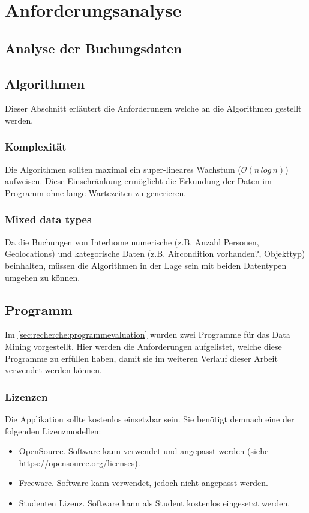 

\chapter{Anforderungsanalyse}
\label{sec:anforderungsanalyse}

\section{Analyse der Buchungsdaten}

\section{Algorithmen}
Dieser Abschnitt erläutert die Anforderungen welche an die Algorithmen gestellt werden.

\subsection{Komplexität}
Die Algorithmen sollten maximal ein super-lineares Wachstum ($\mathcal{O}(n\,log\,n)$) aufweisen. Diese Einschränkung ermöglicht die Erkundung der Daten im Programm ohne lange Wartezeiten zu generieren.

\subsection{Mixed data types}
Da die Buchungen von Interhome numerische (z.B. Anzahl Personen, Geolocations) und kategorische Daten (z.B. Aircondition vorhanden?, Objekttyp) beinhalten, müssen die Algorithmen in der Lage sein mit beiden Datentypen umgehen zu können.

\section{Programm}
Im \cref{sec:recherche:programmevaluation}  wurden zwei Programme für das Data Mining vorgestellt. Hier werden die Anforderungen aufgelistet, welche diese Programme zu erfüllen haben, damit sie im weiteren Verlauf dieser Arbeit verwendet werden können.

\subsection{Lizenzen}
Die Applikation sollte kostenlos einsetzbar sein. Sie benötigt demnach eine der folgenden Lizenzmodellen:
\begin{itemize}
\item OpenSource. Software kann verwendet und angepasst werden (siehe \url{https://opensource.org/licenses}).
\item Freeware. Software kann verwendet, jedoch nicht angepasst werden.
\item Studenten Lizenz. Software kann als Student kostenlos eingesetzt werden.
\end{itemize}

